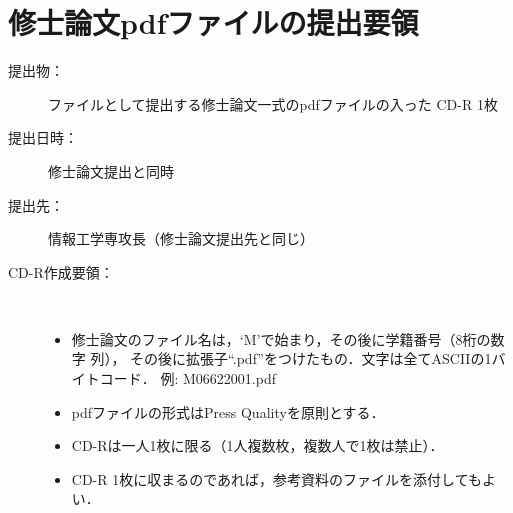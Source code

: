 \documentclass[main]{subfiles}
\begin{document}
\appendix %
\chapter{修士論文pdfファイルの提出要領}
\begin{description}
\item[提出物：] ファイルとして提出する修士論文一式のpdfファイルの入った
CD-R 1枚
\item[提出日時：] 修士論文提出と同時
\item[提出先：] 情報工学専攻長（修士論文提出先と同じ）
\item[CD-R作成要領：] 　
\begin{itemize}
\item 修士論文のファイル名は，`M'で始まり，その後に学籍番号（8桁の数字
      列），
その後に拡張子``.pdf''をつけたもの．文字は全てASCIIの1バイトコード．
例: M06622001.pdf
\item pdfファイルの形式はPress Qualityを原則とする．
\item CD-Rは一人1枚に限る（1人複数枚，複数人で1枚は禁止）．
\item CD-R 1枚に収まるのであれば，参考資料のファイルを添付してもよい．
\end{itemize}
\end{description}
\end{document}
